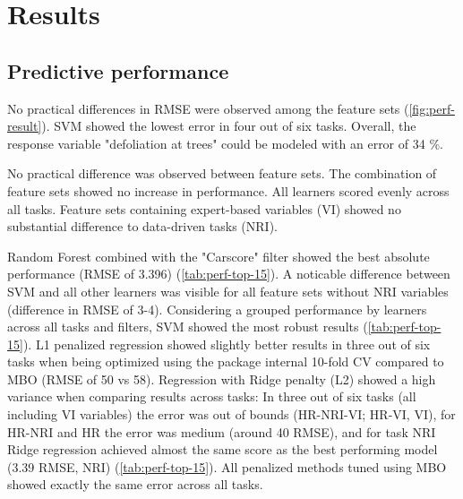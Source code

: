 \documentclass[letterpaper, journal]{IEEEtran}
\begin{document}
\section{Results}

\subsection{Predictive performance}

\noindent No practical differences in RMSE were observed among the feature sets (\autoref{fig:perf-result}).
SVM showed the lowest error in four out of six tasks.
Overall, the response variable "defoliation at trees" could be modeled with an error of 34 \%.

No practical difference was observed between feature sets.
The combination of feature sets showed no increase in performance.
All learners scored evenly across all tasks.
Feature sets containing expert-based variables (VI) showed no substantial difference to data-driven tasks (NRI).

Random Forest combined with the "Carscore" filter showed the best absolute performance (RMSE of 3.396) (\autoref{tab:perf-top-15}).
A noticable difference between SVM and all other learners was visible for all feature sets without NRI variables (difference in RMSE of 3-4).
Considering a grouped performance by learners across all tasks and filters, SVM showed the most robust results (\autoref{tab:perf-top-15}).
L1 penalized regression showed slightly better results in three out of six tasks when being optimized using the package internal 10-fold CV compared to MBO (RMSE of 50 vs 58).
Regression with Ridge penalty (L2) showed a high variance when comparing results across tasks: In three out of six tasks (all including VI variables) the error was out of bounds (HR-NRI-VI; HR-VI, VI), for HR-NRI and HR the error was medium (around 40 RMSE), and for task NRI Ridge regression achieved almost the same score as the best performing model (3.39 RMSE, NRI) (\autoref{tab:perf-top-15}).
All penalized methods tuned using MBO showed exactly the same error across all tasks.
\end{document}
